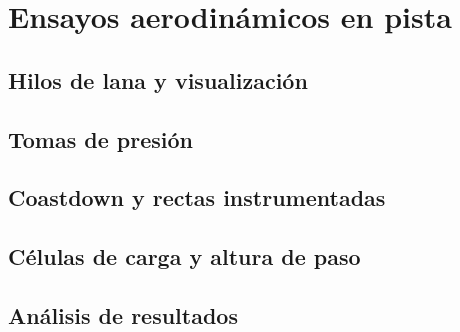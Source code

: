 \chapter{Ensayos aerodinámicos en pista}
\label{ch:ensayos_pista_aero}

\begin{objetivos}
  \item {}
  \item {}
  \item {}
\end{objetivos}


\section{Hilos de lana y visualización}
\label{sec:ensayos_pista_aero:01}

\section{Tomas de presión}
\label{sec:ensayos_pista_aero:02}

\section{Coastdown y rectas instrumentadas}
\label{sec:ensayos_pista_aero:03}

\section{Células de carga y altura de paso}
\label{sec:ensayos_pista_aero:04}

\section{Análisis de resultados}
\label{sec:ensayos_pista_aero:05}


